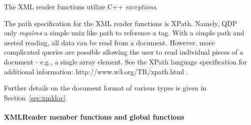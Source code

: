 \documentclass[12pt,letterpaper]{article}
\newcommand{\cpp}{C++}
\begin{document}
The XML reader functions utilize \cpp{} {\em exceptions}. 

The path specification for the XML reader functions is XPath. Namely,
QDP only {\em requires} a simple unix like path to reference a
tag. With a simple path and nested reading, all data can be read from
a document.  However, more complicated queries are possible
allowing the user to read individual pieces of a document - e.g., a
single array element. See the XPath language specification for
additional information: http://www.w3.org/TR/xpath.html .

Further details on the document format of various types is given in
Section~\ref{sec:xmldoc}.

\paragraph{XMLReader member functions and global functions}
\end{document}
